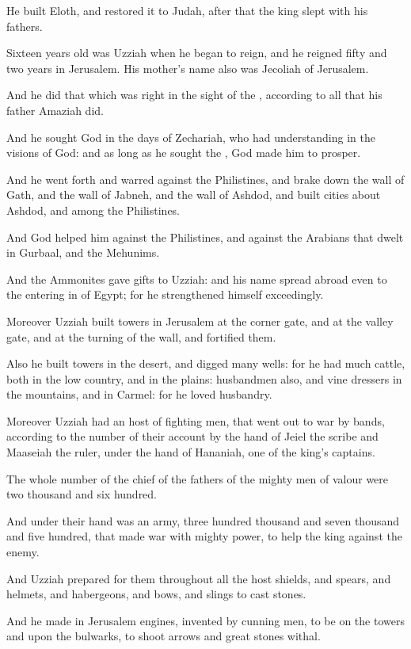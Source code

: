\verse He built Eloth, and restored it to Judah, after that the king slept with his fathers.

\verse Sixteen years old was Uzziah when he began to reign, and he reigned fifty and two years in Jerusalem. His mother's name also was Jecoliah of Jerusalem.

\verse And he did that which was right in the sight of the \LORD, according to all that his father Amaziah did.

\verse And he sought God in the days of Zechariah, who had understanding in the visions of God: and as long as he sought the \LORD, God made him to prosper.

\verse And he went forth and warred against the Philistines, and brake down the wall of Gath, and the wall of Jabneh, and the wall of Ashdod, and built cities about Ashdod, and among the Philistines.

\verse And God helped him against the Philistines, and against the Arabians that dwelt in Gurbaal, and the Mehunims.

\verse And the Ammonites gave gifts to Uzziah: and his name spread abroad even to the entering in of Egypt; for he strengthened himself exceedingly.

\verse Moreover Uzziah built towers in Jerusalem at the corner gate, and at the valley gate, and at the turning of the wall, and fortified them.

\verse Also he built towers in the desert, and digged many wells: for he had much cattle, both in the low country, and in the plains: husbandmen also, and vine dressers in the mountains, and in Carmel: for he loved husbandry.

\verse Moreover Uzziah had an host of fighting men, that went out to war by bands, according to the number of their account by the hand of Jeiel the scribe and Maaseiah the ruler, under the hand of Hananiah, one of the king's captains.

\verse The whole number of the chief of the fathers of the mighty men of valour were two thousand and six hundred.

\verse And under their hand was an army, three hundred thousand and seven thousand and five hundred, that made war with mighty power, to help the king against the enemy.

\verse And Uzziah prepared for them throughout all the host shields, and spears, and helmets, and habergeons, and bows, and slings to cast stones.

\verse And he made in Jerusalem engines, invented by cunning men, to be on the towers and upon the bulwarks, to shoot arrows and great stones withal.

